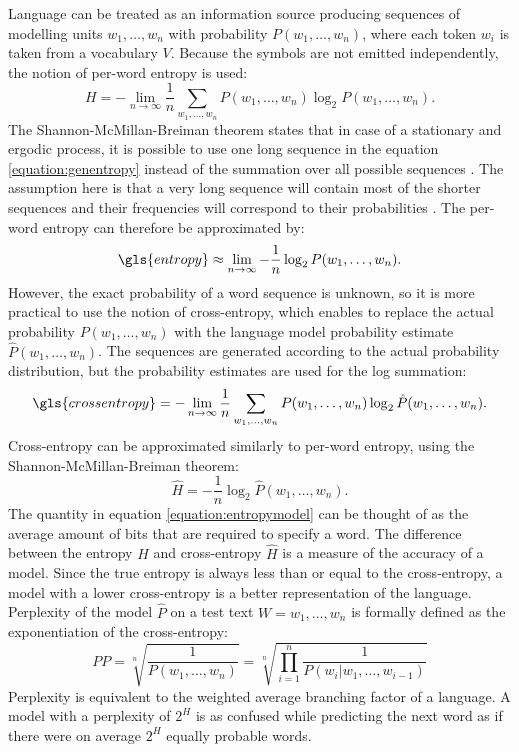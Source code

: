 	Language can be treated as an information source producing sequences of modelling units $w_{1}, \dots, w_{n}$ with probability $P(w_{1}, \dots, w_{n})$, where each token $w_{i}$ is taken from a vocabulary $V$. Because the symbols are not emitted independently, the notion of per-word entropy is used:
	\begin{equation}
		H=-\lim_{n\to\infty}\frac{1}{n}\sum_{w_{1}, \dots, w_{n}}P(w_{1}, \dots, w_{n})\log_{2}P(w_{1}, \dots, w_{n}).
		\label{equation:genentropy}
	\end{equation}
	The Shannon-McMillan-Breiman theorem states that in case of a stationary and ergodic process, it is possible to use one long sequence in the equation \ref{equation:genentropy} instead of the summation over all possible sequences \cite{algoet1988sandwich}. The assumption here is that a very long sequence will contain most of the shorter sequences and their frequencies will correspond to their probabilities \cite{jurafsky2000speech}. The per-word entropy can therefore be approximated by:
	\begin{equation}
		\gls{entropy}\approx\lim_{n\to\infty}-\frac{1}{n}\log_{2}P(w_{1}, \dots, w_{n}).
		\label{equation:approxentropy}
	\end{equation}
	However, the exact probability of a word sequence is unknown, so it is more practical to use the notion of cross-entropy, which enables to replace the actual probability $P(w_{1}, \dots, w_{n})$ with the language model probability estimate $\hat{P}(w_{1}, \dots, w_{n})$. The sequences are generated according to the actual probability distribution, but the probability estimates are used for the log summation:
	\begin{equation}
		\gls{crossentropy}=-\lim_{n\to\infty}\frac{1}{n}\sum_{w_{1}, \dots, w_{n}}P(w_{1}, \dots, w_{n})\log_{2}\hat{P}(w_{1}, \dots, w_{n}).
		\label{equation:crossentropy}
	\end{equation}
	Cross-entropy can be approximated similarly to per-word entropy, using the Shannon-McMillan-Breiman theorem:
	\begin{equation}
		\hat{H}=-\frac{1}{n}\log_{2}\hat{P}(w_{1}, \dots, w_{n}).
		\label{equation:entropymodel}
	\end{equation}
	The quantity in equation \ref{equation:entropymodel} can be thought of as the average amount of bits that are required to specify a word. The difference between the entropy $H$ and cross-entropy $\hat{H}$ is a measure of the accuracy of a model. Since the true entropy is always less than or equal to the cross-entropy, a model with a lower cross-entropy is a better representation of the language. Perplexity of the model $\hat{P}$ on a test text $W=w_{1}, \dots, w_{n}$ is formally defined as the exponentiation of the cross-entropy:
	\begin{equation}
		PP=\sqrt[n]{\frac{1}{P(w_{1}, \dots, w_{n})}}=\sqrt[n]{\prod_{i=1}^{n}\frac{1}{P(w_{i}|w_{1}, \dots, w_{i-1})}}
		\label{equation:perplexity}
	\end{equation}
	Perplexity is equivalent to the weighted average branching factor of a language. A model with a perplexity of $2^{H}$ is as confused while predicting the next word as if there were on average $2^{H}$ equally probable words.

